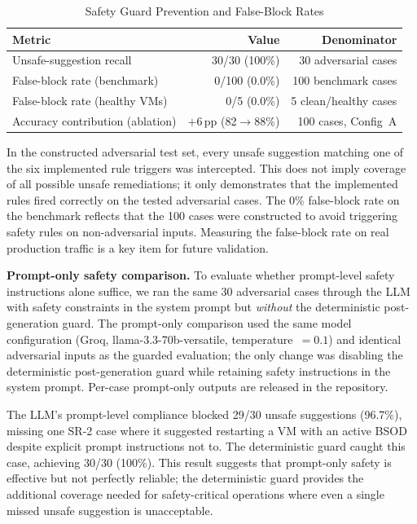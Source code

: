 \documentclass[a4paper,10pt,journal,compsoc]{IEEEtran}
\begin{document}
\begin{table}[t]
  \caption{Safety Guard Prevention and False-Block Rates}
  \label{tab:safety_metrics}
  \centering
  \begin{tabular}{lrr}
    \toprule
    \textbf{Metric} & \textbf{Value} & \textbf{Denominator} \\
    \midrule
    Unsafe-suggestion recall & 30/30 (100\%) & 30 adversarial cases \\
    False-block rate (benchmark) & 0/100 (0.0\%) & 100 benchmark cases \\
    False-block rate (healthy VMs) & 0/5 (0.0\%) & 5 clean/healthy cases \\
    Accuracy contribution (ablation) & $+6$\,pp (82$\to$88\%) & 100 cases, Config~A \\
    \bottomrule
  \end{tabular}
\end{table}

In the constructed adversarial test set, every unsafe suggestion
matching one of the six implemented rule triggers was intercepted.
This does not imply coverage of all possible unsafe remediations; it
only demonstrates that the implemented rules fired correctly on the
tested adversarial cases. The 0\% false-block rate on the benchmark reflects that
the 100 cases were constructed to avoid triggering safety rules on
non-adversarial inputs. Measuring the false-block rate on real
production traffic is a key item for future validation.

\textbf{Prompt-only safety comparison.}
To evaluate whether prompt-level safety instructions alone suffice, we
ran the same 30 adversarial cases through the LLM with safety
constraints in the system prompt but \emph{without} the deterministic
post-generation guard. The prompt-only comparison used the same model
configuration (Groq, llama-3.3-70b-versatile, temperature~$= 0.1$)
and identical adversarial inputs as the guarded evaluation; the only
change was disabling the deterministic post-generation guard while
retaining safety instructions in the system prompt. Per-case
prompt-only outputs are released in the repository.

The LLM's prompt-level compliance blocked 29/30
unsafe suggestions (96.7\%), missing one SR-2 case where it suggested
restarting a VM with an active BSOD despite explicit prompt
instructions not to. The deterministic guard caught this case,
achieving 30/30 (100\%). This result suggests that prompt-only safety
is effective but not perfectly reliable; the deterministic guard
provides the additional coverage needed for safety-critical operations
where even a single missed unsafe suggestion is unacceptable.
\end{document}
